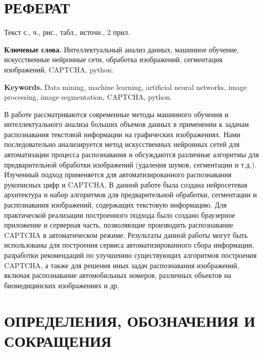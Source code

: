 \documentclass[a4paper,12pt,russian]{article} %
\begin{document}
\setcounter{page}{2}

\newpage
\section*{РЕФЕРАТ}

Текст  \pageref{LastPage} с.,  ч.,  рис.,  табл.,  источн., 2 прил.

\vspace{0.8cm}

\textbf{Ключевые слова.} Интеллектуальный анализ данных, машинное обучение, искусственные нейронные сети, обработка изображений, сегментация изображений, CAPTCHA, python.

\textbf{Keywords.} Data mining, machine learning, artificial neural networks, image processing, image segmentation, CAPTCHA, python.

\vspace{0.8cm}

В работе рассматриваются современные методы машинного обучения и интеллектуального анализа больших объемов данных в применении к задачам распознавания текстовой информации на графических изображениях.
Нами последовательно анализируется метод искусственных нейронных сетей для автоматизации процесса распознавания и обсуждаются различные алгоритмы для предварительной обработки изображений (удаления шумов, сегментации и т.д.).
Изученный подход применяется для автоматизированного распознавания рукописных цифр и CAPTCHA,
В данной работе была создана нейросетевая архитектура и набор алгоритмов для предварительной обработки, сегментации и распознавания изображений, содержащих текстовую информацию.
Для практической реализации построенного подхода было создано браузерное приложение и серверная часть, позволяющие производить распознавание CAPTCHA в автоматическом режиме.
Результаты данной работы могут быть использованы для построения сервиса автоматизированного сбора информации, разработки рекомендаций по улучшению существующих алгоритмов построения CAPTCHA, а также для решения иных задач распознавания изображений, включая распознавание автомобильных номеров, различных объектов на биомедицинских изображениях и др.

\newpage		
\renewcommand*{\contentsname}{\begin{center}СОДЕРЖАНИЕ\end{center}}
\tableofcontents

\newpage
\section*{ОПРЕДЕЛЕНИЯ, ОБОЗНАЧЕНИЯ И СОКРАЩЕНИЯ}
\end{document}
